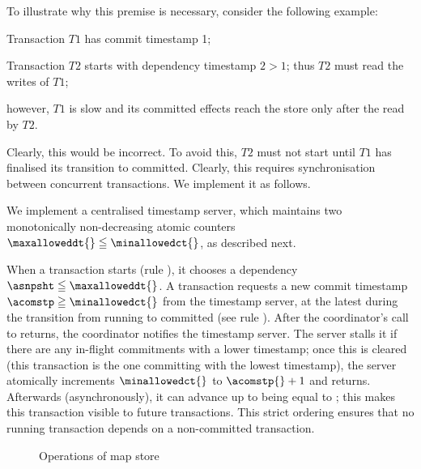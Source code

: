 To illustrate why this premise is necessary, consider the following example:
\begin{inparaenum}
\item
  Transaction $T1$ has commit timestamp 1;
\item
  Transaction $T2$ starts with dependency timestamp $2>1$; thus $T2$
  must read the writes of $T1$;
\item
  however, $T1$ is slow and its committed effects reach the store only
  after the read by $T2$.
\end{inparaenum}
Clearly, this would be incorrect.
To avoid this, $T2$ must not start until $T1$ has finalised its
transition to committed.
Clearly, this requires synchronisation between concurrent transactions.
We implement it as follows.

We implement a centralised timestamp server, which maintains two
monotonically non-decreasing atomic counters $\maxalloweddt{} \leqq
\minallowedct{}$, as described next.

When a transaction starts (rule \starttxnrule{}), it chooses a
dependency $\asnpsht \leqq \maxalloweddt{}$.
A transaction requests a new commit timestamp $\acomstp \geqq
\minallowedct{}$ from the timestamp server, at the latest during the
transition from running to committed (see rule \commitrule{}).
After the coordinator's call to \doCommit{} returns, the coordinator
notifies the timestamp server.
The server stalls it if there are any in-flight commitments with a lower
timestamp; once this is cleared (this transaction is the one committing
with the lowest timestamp), the server atomically increments
$\minallowedct{}$ to $\acomstp{}+1$ and returns.
Afterwards (asynchronously), it can advance \maxalloweddt{} up to being
equal to \minallowedct{}; this makes this transaction visible to future
transactions.
This strict ordering ensures that no running transaction depends on a
non-committed transaction.



\begin{figure}[tp]
  \centering \small\centering
  
  \caption{Operations of map store}
  \label{fig:map-store-semantics}
\end{figure}
%   

